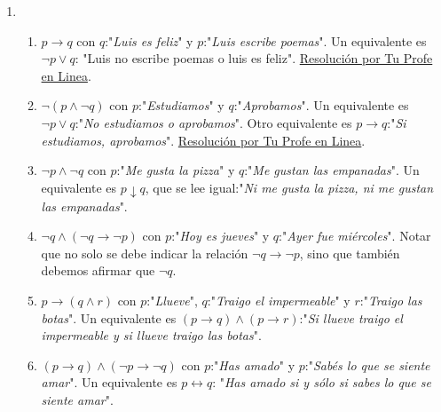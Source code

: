 \documentclass[a4paper]{article}
\newcommand{\exercise}{\item}
\newcommand{\then}{\to}
\newcommand{\eq}{\leftrightarrow}
\begin{document}
\begin{enumerate}
\begin{enumerate} [label=(\alph*)]
		\item Función exclamativa, no es proposición.
		\item Es complicado. Debemos preguntarnos si hay una afirmación en esta frase. Primero deberíamos reformularla para entender si hay un verbo implicito. "Si alguien te regala un caballo, no deberías mirarle los dientes". Aquí se observa que hay una afirmación sobre si deberíamos mirarle los dientes al caballo o no. Esta afirmación sí es una proposición pero puede ser verdadera o falsa. Si nuestra interpretación de la frase es una órden como "Si te regalan un caballo, no le mires los dientes" esta oración no será una proposición, notar que se pierde el verbo \textit{deberías}. El hecho de que no haya una respuesta clara y correcta sobre este ejercicio muestra que la lógica esta limitada a la interpretación previa del lenguaje.
\end{enumerate}\exercise\begin{enumerate} [label=(\alph*)]		\item $p \then q$ con $q$:"\textit{Luis es feliz}" y $p$:"\textit{Luis escribe poemas}". Un equivalente es $\neg p \lor q$: "Luis no escribe poemas o luis es feliz". \href{https://youtu.be/HXzyX5XGPp8?t=374}{Resolución por Tu Profe en Linea}.
		\item $\neg (p \land \neg q)$ con $p$:"\textit{Estudiamos}" y $q$:"\textit{Aprobamos}". Un equivalente es $\neg p \lor q$:"\textit{No estudiamos o aprobamos}". Otro equivalente es $p \then q$:"\textit{Si estudiamos, aprobamos}". \href{https://youtu.be/HXzyX5XGPp8}{Resolución por Tu Profe en Linea}.
		\item $\neg p  \land  \neg q$ con $p$:"\textit{Me gusta la pizza}" y $q$:"\textit{Me gustan las empanadas}". Un equivalente es $p \downarrow  q$, que se lee igual:"\textit{Ni me gusta la pizza, ni me gustan las empanadas}".
		\item $\neg q \land (\neg q\then \neg p)$ con $p$:"\textit{Hoy es jueves}" y $q$:"\textit{Ayer fue miércoles}". Notar que no solo se debe indicar la relación $\neg q\then \neg p$, sino que también debemos afirmar que $\neg q$.
		\item $p \then  ( q  \land  r )$ con $p$:"\textit{Llueve}", $q$:"\textit{Traigo el impermeable}" y $r$:"\textit{Traigo las botas}". Un equivalente es $(p \then q) \land (p \then r )$:"\textit{Si llueve traigo el impermeable y si llueve traigo las botas}".
		\item $( p \then  q )  \land  ( \neg p \then  \neg q )$ con $p$:"\textit{Has amado}" y $p$:"\textit{Sabés lo que se siente amar}". Un equivalente es $p \eq  q$: "\textit{Has amado si y sólo si sabes lo que se siente amar}".

\end{enumerate}
\end{enumerate}
\end{document}
